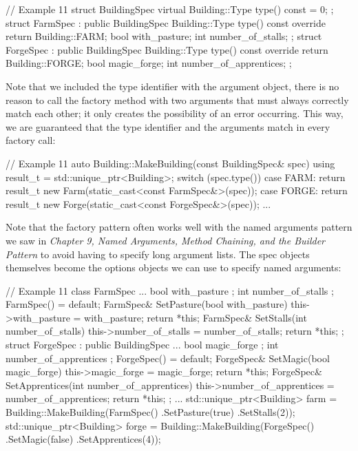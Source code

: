 \begin{code}
// Example 11
struct BuildingSpec {
  virtual Building::Type type() const = 0;
};
struct FarmSpec : public BuildingSpec {
  Building::Type type() const override {
    return Building::FARM;
  }
  bool with_pasture;
  int number_of_stalls;
};
struct ForgeSpec : public BuildingSpec {
  Building::Type type() const override {
    return Building::FORGE;
  }
  bool magic_forge;
  int number_of_apprentices;
};
\end{code}

Note that we included the type identifier with the argument object, there is no reason to call the factory method with two arguments that must always correctly match each other; it only creates the possibility of an error occurring. This way, we are guaranteed that the type identifier and the arguments match in every factory call:

\begin{code}
// Example 11
auto Building::MakeBuilding(const BuildingSpec& spec) {
  using result_t = std::unique_ptr<Building>;
  switch (spec.type()) {
    case FARM: return result_t{
      new Farm(static_cast<const FarmSpec&>(spec))};
    case FORGE: return result_t{
      new Forge(static_cast<const ForgeSpec&>(spec))};
    ...
  }
}
\end{code}

Note that the factory pattern often works well with the named arguments pattern we saw in \emph{Chapter 9, Named Arguments, Method Chaining, and the Builder Pattern} to avoid having to specify long argument lists. The spec objects themselves become the options objects we can use to specify named arguments:

\begin{code}
// Example 11
class FarmSpec {
  ...
  bool with_pasture {};
  int number_of_stalls {};
  FarmSpec() = default;
  FarmSpec& SetPasture(bool with_pasture) {
    this->with_pasture = with_pasture;
    return *this;
  }
  FarmSpec& SetStalls(int number_of_stalls) {
    this->number_of_stalls = number_of_stalls;
    return *this;
  }
};
struct ForgeSpec : public BuildingSpec {
  ...
  bool magic_forge {};
  int number_of_apprentices {};
  ForgeSpec() = default;
  ForgeSpec& SetMagic(bool magic_forge) {
    this->magic_forge = magic_forge;
    return *this;
  }
  ForgeSpec& SetApprentices(int number_of_apprentices) {
    this->number_of_apprentices = number_of_apprentices;
    return *this;
  }
};
...
std::unique_ptr<Building> farm =
  Building::MakeBuilding(FarmSpec()
                         .SetPasture(true)
                         .SetStalls(2));
std::unique_ptr<Building> forge =
  Building::MakeBuilding(ForgeSpec()
                         .SetMagic(false)
                         .SetApprentices(4));
\end{code}

